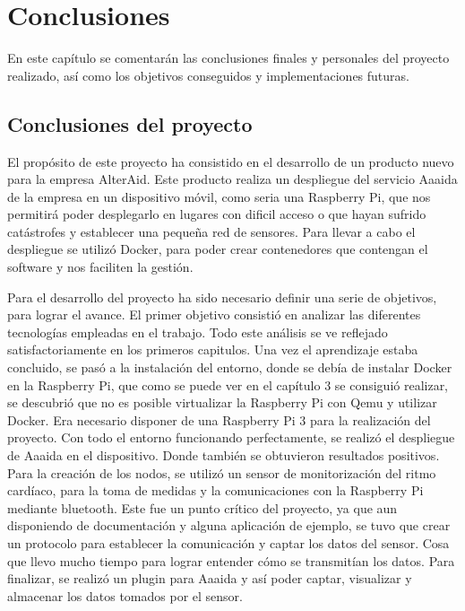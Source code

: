 \cleardoublepage
{}
\chapter*{Conclusiones}

En este capítulo se comentarán las conclusiones finales y personales del proyecto realizado, así como los objetivos conseguidos y implementaciones futuras.


\section{Conclusiones del proyecto}

El propósito de este proyecto ha consistido en el desarrollo de un producto nuevo para la empresa AlterAid. Este producto realiza un despliegue del servicio Aaaida de la empresa en un dispositivo móvil, como seria una Raspberry Pi, que nos permitirá poder desplegarlo en lugares con dificil acceso o que hayan sufrido catástrofes y establecer una pequeña red de sensores. 
Para llevar a cabo el despliegue se utilizó Docker, para poder crear contenedores que contengan el software y nos faciliten la gestión. 

Para el desarrollo del proyecto ha sido necesario definir una serie de objetivos, para lograr el avance. El primer objetivo consistió en analizar las diferentes tecnologías empleadas en el trabajo. Todo este análisis se ve reflejado satisfactoriamente en los primeros capitulos. 
Una vez el aprendizaje estaba concluido, se pasó a la instalación del entorno, donde se debía de instalar Docker en la Raspberry Pi, que como se puede ver en el capítulo 3 se consiguió realizar, se descubrió que no es posible virtualizar la Raspberry Pi con Qemu y utilizar Docker. Era necesario disponer de una Raspberry Pi 3 para la realización del proyecto. Con todo el entorno funcionando perfectamente, se realizó el despliegue de Aaaida en el dispositivo. Donde también se obtuvieron resultados positivos. Para la creación de los nodos, se utilizó un sensor de monitorización del ritmo cardíaco, para la toma de medidas y la comunicaciones con la Raspberry Pi mediante bluetooth. Este fue un punto crítico del proyecto, ya que aun disponiendo de documentación y alguna aplicación de ejemplo, se tuvo que crear un protocolo para establecer la comunicación y captar los datos del sensor. Cosa que llevo mucho tiempo para lograr entender cómo se transmitían los datos. Para finalizar, se realizó un plugin para Aaaida y así poder captar, visualizar y almacenar los datos tomados por el sensor. 

